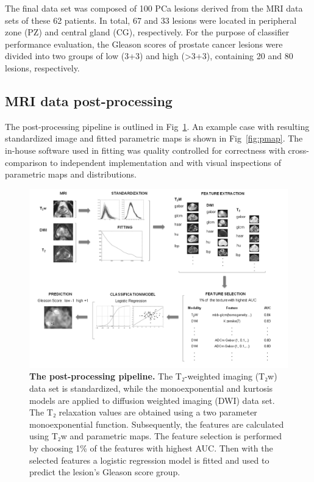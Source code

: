 The final data set was composed of 100 PCa lesions derived from the MRI data
sets of these 62 patients. In total, 67 and 33 lesions were located in
peripheral zone (PZ) and central gland (CG), respectively. For the purpose of
classifier performance evaluation, the Gleason scores of prostate cancer lesions
were divided into two groups of low (3+3) and high (>3+3), containing 20 and 80
lesions, respectively.


\subsection{MRI data post-processing}

The post-processing pipeline is outlined in Fig~\ref{fig:pipeline}. An
example case with resulting standardized image and fitted parametric maps is
shown in Fig~\ref{fig:pmap}. The in-house software used in fitting was
quality controlled for correctness with cross-comparison to independent
implementation and with visual inspections of parametric maps and distributions.

\begin{figure}[!h]
    \centering \includegraphics[width=1.0\textwidth]{figures/fig1}
    \caption{{\bf The post-processing pipeline.}
    The T₂-weighted imaging (T₂w) data set is standardized, while the
    monoexponential and kurtosis models are applied to diffusion weighted
    imaging (DWI) data set. The T₂ relaxation values are obtained using a two
    parameter monoexponential function. Subsequently, the features are
    calculated using T₂w and parametric maps. The feature selection is performed
    by choosing 1\% of the features with highest AUC\@. Then with the selected
    features a logistic regression model is fitted and used to predict the
    lesion's Gleason score group.}%
    \label{fig:pipeline}
\end{figure}

